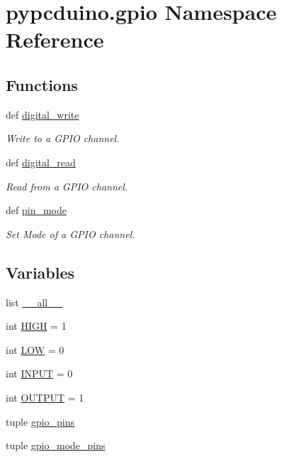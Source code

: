 \hypertarget{namespacepypcduino_1_1gpio}{\section{pypcduino.\-gpio Namespace Reference}
\label{namespacepypcduino_1_1gpio}
}
\subsection*{Functions}
\begin{DoxyCompactItemize}
\item 
def \hyperlink{namespacepypcduino_1_1gpio_aba7c287e8da39dc2e5f7951ebe7819a4}{digital\-\_\-write}
\begin{DoxyCompactList}\small\item\em Write to a G\-P\-I\-O channel. \end{DoxyCompactList}\item 
def \hyperlink{namespacepypcduino_1_1gpio_aa324a331fb50643f94e222b8eef38fe8}{digital\-\_\-read}
\begin{DoxyCompactList}\small\item\em Read from a G\-P\-I\-O channel. \end{DoxyCompactList}\item 
def \hyperlink{namespacepypcduino_1_1gpio_af0917a2382b59c8825b60df9cc4d6830}{pin\-\_\-mode}
\begin{DoxyCompactList}\small\item\em Set Mode of a G\-P\-I\-O channel. \end{DoxyCompactList}\end{DoxyCompactItemize}
\subsection*{Variables}
\begin{DoxyCompactItemize}
\item 
list \hyperlink{namespacepypcduino_1_1gpio_a8a55cdc8c6b775ffa9ba8aa68cfd8d93}{\-\_\-\-\_\-all\-\_\-\-\_\-}
\item 
int \hyperlink{namespacepypcduino_1_1gpio_a017380b78afe9853e0cc3ca009c47ec3}{H\-I\-G\-H} = 1
\item 
int \hyperlink{namespacepypcduino_1_1gpio_a7794534b6aba1a94e2ed468ec8fbed98}{L\-O\-W} = 0
\item 
int \hyperlink{namespacepypcduino_1_1gpio_afabe8a2ce86d5db92f8e5994e5c24252}{I\-N\-P\-U\-T} = 0
\item 
int \hyperlink{namespacepypcduino_1_1gpio_a810c8642dc31f28d747c4c845e8a4a80}{O\-U\-T\-P\-U\-T} = 1
\item 
tuple \hyperlink{namespacepypcduino_1_1gpio_acf2dcb151997749e99dbf65c08073e08}{gpio\-\_\-pins}
\item 
tuple \hyperlink{namespacepypcduino_1_1gpio_a3e40fb727c6bb0d0f1bcf69478a9a1c0}{gpio\-\_\-mode\-\_\-pins}
\end{DoxyCompactItemize}


